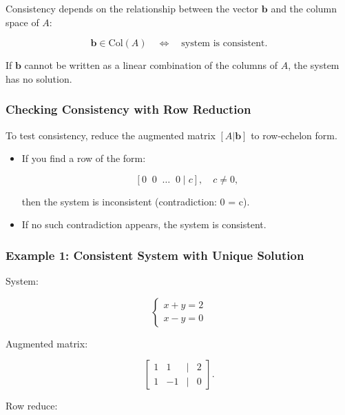 \documentclass[
  letterpaper,
  DIV=11,
  numbers=noendperiod]{scrreprt}
\begin{document}
Consistency depends on the relationship between the vector
\(\mathbf{b}\) and the column space of \(A\):

\[
\mathbf{b} \in \text{Col}(A) \quad \iff \quad \text{system is consistent}.
\]

If \(\mathbf{b}\) cannot be written as a linear combination of the
columns of \(A\), the system has no solution.

\subsubsection{Checking Consistency with Row
Reduction}\label{checking-consistency-with-row-reduction}

To test consistency, reduce the augmented matrix \([A | \mathbf{b}]\) to
row-echelon form.

\begin{itemize}
\item
  If you find a row of the form:

  \[
  [0 \;\; 0 \;\; \dots \;\; 0 \;|\; c], \quad c \neq 0,
  \]

  then the system is inconsistent (contradiction: 0 = c).
\item
  If no such contradiction appears, the system is consistent.
\end{itemize}

\subsubsection{Example 1: Consistent System with Unique
Solution}\label{example-1-consistent-system-with-unique-solution}

System:

\[
\begin{cases}  
x + y = 2 \\  
x - y = 0  
\end{cases}
\]

Augmented matrix:

\[
\begin{bmatrix}  
1 & 1 & | & 2 \\  
1 & -1 & | & 0  
\end{bmatrix}.
\]

Row reduce:
\end{document}
